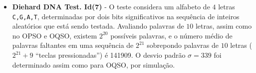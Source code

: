 \begin{itemize}
   \item \textbf{Diehard DNA Test. Id(7)} - O teste considera um alfabeto de $4$ letras \texttt{C,G,A,T}, determinadas por dois bits significativos na sequência de inteiros aleatórios que está sendo testada. Avaliando palavras de $10$ letras, assim como no OPSO e OQSO, existem $2^{20}$ possíveis palavras, e o número médio de palavras faltantes em uma sequência de $2^{21}$ sobrepondo palavras de $10$ letras ($2^{21}+9$ ``teclas pressionadas'') é 141909. O desvio padrão $\sigma=339$ foi determinado assim como para OQSO, por simulação.


\end{itemize}
